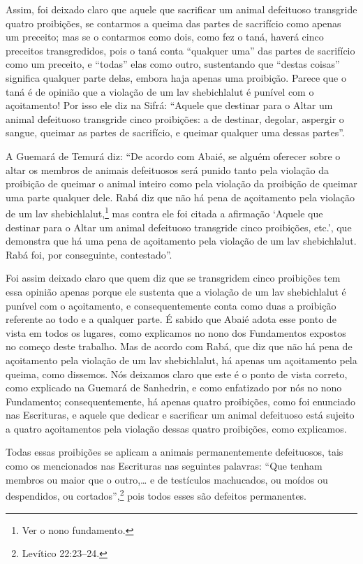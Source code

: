 \begin{multicols}{2}
Assim, foi deixado claro que aquele que sacrificar um animal defeituoso
transgride quatro proibições, se contarmos a queima das partes de
sacrifício como apenas um preceito; mas se o contarmos como dois, como
fez o taná\starr, haverá cinco preceitos
transgredidos, pois o taná\starr{} conta ``qualquer uma'' das partes de
sacrifício como um preceito, e ``todas'' elas como outro, sustentando
que ``destas coisas'' significa qualquer parte delas, embora haja
apenas uma proibição. Parece que o taná\starr{} é de opinião que a violação
de um lav shebichlalut\starr{} é punível com o açoitamento! Por isso ele diz na
Sifrá\starr: ``Aquele que destinar para o Altar um animal defeituoso
transgride cinco proibições: a de destinar, degolar, aspergir o sangue,
queimar as partes de sacrifício, e queimar qualquer uma dessas
partes''.

A Guemará\starr{} de Temurá\starr{} diz: ``De acordo com Abaié\starr, se alguém oferecer
sobre o altar os membros de animais defeituosos será punido tanto pela
violação da proibição de queimar o animal inteiro como pela violação da
proibição de queimar uma parte qualquer dele. Rabá\starr{} diz que não há pena
de açoitamento pela violação de um lav shebichlalut\starr,\footnote{Ver o nono fundamento.} mas contra ele foi citada a
afirmação `Aquele que destinar para o Altar um animal defeituoso
transgride cinco proibições, etc.', que demonstra que há uma pena de
açoitamento pela violação de um lav shebichlalut\starr. Rabá\starr{} foi, por
conseguinte, contestado''.

Foi assim deixado claro que quem diz que se transgridem cinco proibições
tem essa opinião apenas porque ele sustenta que a violação de um lav shebichlalut\starr{} é punível com o açoitamento, e consequentemente conta
como duas a proibição referente ao todo e a qualquer parte. É sabido que
Abaié\starr{} adota esse ponto de vista em todos os lugares, como explicamos no
nono dos Fundamentos expostos no começo deste trabalho. Mas de acordo
com Rabá\starr, que diz que não há pena de açoitamento pela violação de um
lav shebichlalut\starr, há apenas um açoitamento pela queima, como
dissemos. Nós deixamos claro que este é o ponto de vista correto, como
explicado na Guemará\starr{} de Sanhedrin\starr, e como enfatizado por nós no nono
Fundamento; consequentemente, há apenas quatro proibições, como foi
enunciado nas Escrituras, e aquele que dedicar e sacrificar um animal
defeituoso está sujeito a quatro açoitamentos pela violação dessas
quatro proibições, como explicamos.

Todas essas proibições se aplicam a animais permanentemente defeituosos,
tais como os mencionados nas Escrituras nas seguintes palavras: ``Que
tenham membros ou maior que o outro,\ldots{} e de testículos machucados, ou
moídos ou despendidos, ou cortados'',\footnote{Levítico 22:23--24.} pois todos
esses são defeitos permanentes.


\end{multicols}
